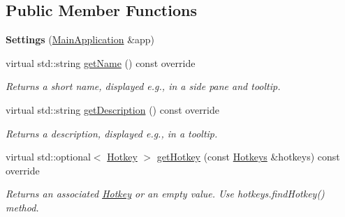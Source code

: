\subsection*{Public Member Functions}
\begin{DoxyCompactItemize}
\item 
\mbox{\label{classpepr3d_1_1_settings_a32bce083767edda443276c495665a1dc}} 
{\bfseries Settings} (\mbox{\hyperlink{classpepr3d_1_1_main_application}{Main\+Application}} \&app)
\item 
\mbox{\label{classpepr3d_1_1_settings_ab1cb768c5f1d54d9dd58534dd52fee9c}} 
virtual std\+::string \mbox{\hyperlink{classpepr3d_1_1_settings_ab1cb768c5f1d54d9dd58534dd52fee9c}{get\+Name}} () const override
\begin{DoxyCompactList}\small\item\em Returns a short name, displayed e.\+g., in a side pane and tooltip. \end{DoxyCompactList}\item 
\mbox{\label{classpepr3d_1_1_settings_af12e0a7190ff25d41a51b483ec661962}} 
virtual std\+::string \mbox{\hyperlink{classpepr3d_1_1_settings_af12e0a7190ff25d41a51b483ec661962}{get\+Description}} () const override
\begin{DoxyCompactList}\small\item\em Returns a description, displayed e.\+g., in a tooltip. \end{DoxyCompactList}\item 
\mbox{\label{classpepr3d_1_1_settings_a4146e189ce75f6703e498b85a83701a0}} 
virtual std\+::optional$<$ \mbox{\hyperlink{structpepr3d_1_1_hotkey}{Hotkey}} $>$ \mbox{\hyperlink{classpepr3d_1_1_settings_a4146e189ce75f6703e498b85a83701a0}{get\+Hotkey}} (const \mbox{\hyperlink{classpepr3d_1_1_hotkeys}{Hotkeys}} \&hotkeys) const override
\begin{DoxyCompactList}\small\item\em Returns an associated \mbox{\hyperlink{structpepr3d_1_1_hotkey}{Hotkey}} or an empty value. Use hotkeys.\+find\+Hotkey() method. \end{DoxyCompactList}\item 
\mbox{\label{classpepr3d_1_1_settings_ab8db98e9aababb2f7a896d000bfd5069}} 

\end{DoxyCompactItemize}
